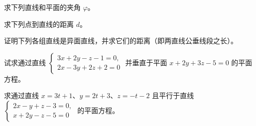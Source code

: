 \noindent\begin{minipage}{\textwidth}
求下列直线和平面的夹角 $\varphi$。
\end{minipage}\par\vfill
\noindent\begin{minipage}{\textwidth}
求下列点到直线的距离 $d$。
\end{minipage}\par\vfill
\noindent\begin{minipage}{\textwidth}
证明下列各组直线是异面直线，并求它们的距离（即两直线公垂线段之长）。
\end{minipage}\par\vfill
\newpage
\noindent\begin{minipage}{\textwidth}
试求通过直线 $\begin{cases}3x+2y-z-1=0,\\2x-3y+2z+2=0\end{cases}$ 并垂直于平面 $x+2y+3z-5=0$ 的平面方程。
\end{minipage}\par\vfill
\noindent\begin{minipage}{\textwidth}
求通过直线 $x=3t+1$、$y=2t+3$、$z=-t-2$ 且平行于直线 $\begin{cases}2x-y+z-3=0,\\x+2y-z-5=0\end{cases}$ 的平面方程。
\end{minipage}\par\vfill
